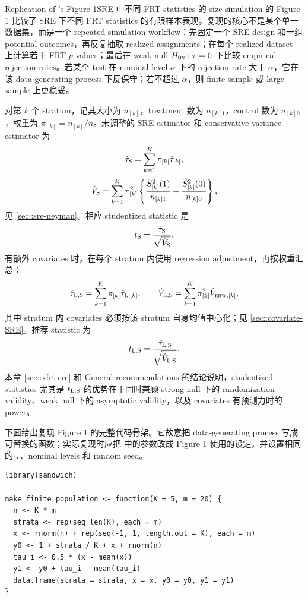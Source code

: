 \begin{exercisesolution}{Replication of \citet{zhao2020caFRT}'s Figure 1}{SRE 中不同 FRT statistics 的 size simulation}
\citet{zhao2020caFRT} 的 Figure 1 比较了 SRE 下不同 FRT statistics 的有限样本表现。复现的核心不是某个单一数据集，而是一个 repeated-simulation workflow：先固定一个 SRE design 和一组 potential outcomes，再反复抽取 realized assignments；在每个 realized dataset 上计算若干 FRT $p$-values；最后在 weak null $H_{0\textsc{n}}:\tau=0$ 下比较 empirical rejection rates。若某个 test 在 nominal level $\alpha$ 下的 rejection rate 大于 $\alpha$，它在该 data-generating process 下反保守；若不超过 $\alpha$，则 finite-sample 或 large-sample 上更稳妥。

对第 $k$ 个 stratum，记其大小为 $n_{[k]}$，treatment 数为 $n_{[k]1}$，control 数为 $n_{[k]0}$，权重为 $\pi_{[k]}=n_{[k]}/n$。未调整的 SRE estimator 和 conservative variance estimator 为
\[
\hat\tau_\textsc{S}
=\sum_{k=1}^K\pi_{[k]}\hat\tau_{[k]},
\]
\[
\hat V_\textsc{S}
=\sum_{k=1}^K\pi_{[k]}^2
\left\{
\frac{\hat S_{[k]}^2(1)}{n_{[k]1}}
+\frac{\hat S_{[k]}^2(0)}{n_{[k]0}}
\right\},
\]
见 \cref{sec::sre-neyman}。相应 studentized statistic 是
\[
t_\textsc{S}=\frac{\hat\tau_\textsc{S}}{\sqrt{\hat V_\textsc{S}}}.
\]
有额外 covariates 时，在每个 stratum 内使用 \citet{lin2013} regression adjustment，再按权重汇总：
\[
\hat\tau_{\textsc{L},\textsc{S}}
=\sum_{k=1}^K\pi_{[k]}\hat\tau_{\textsc{L},[k]},
\qquad
\hat V_{\textsc{L},\textsc{S}}
=\sum_{k=1}^K\pi_{[k]}^2\hat V_{\textsc{ehw},[k]},
\]
其中 stratum 内 covariates 必须按该 stratum 自身均值中心化；见 \cref{sec::covariate-SRE}。推荐 statistic 为
\[
t_{\textsc{L},\textsc{S}}
=\frac{\hat\tau_{\textsc{L},\textsc{S}}}
{\sqrt{\hat V_{\textsc{L},\textsc{S}}}}.
\]
本章 \cref{sec::xfrt-cre} 和 General recommendations 的结论说明，studentized statistics 尤其是 $t_{\textsc{L},\textsc{S}}$ 的优势在于同时兼顾 strong null 下的 randomization validity、weak null 下的 asymptotic validity，以及 covariates 有预测力时的 power。

下面给出复现 Figure 1 的完整代码骨架。它故意把 data-generating process 写成可替换的函数；实际复现时应把  中的参数改成 \citet{zhao2020caFRT} Figure 1 使用的设定，并设置相同的 、、nominal levels 和 random seed。
\begin{lstlisting}
library(sandwich)

make_finite_population <- function(K = 5, m = 20) {
  n <- K * m
  strata <- rep(seq_len(K), each = m)
  x <- rnorm(n) + rep(seq(-1, 1, length.out = K), each = m)
  y0 <- 1 + strata / K + x + rnorm(n)
  tau_i <- 0.5 * (x - mean(x))
  y1 <- y0 + tau_i - mean(tau_i)
  data.frame(strata = strata, x = x, y0 = y0, y1 = y1)
}


\end{lstlisting}
\end{exercisesolution}
